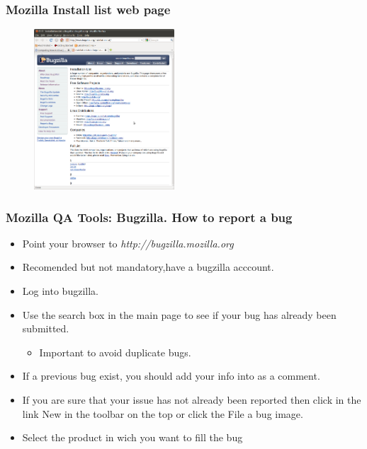 \documentclass{beamer}
\begin{document}
\begin{frame}
\frametitle{Mozilla Install list web page}
\begin{center}
\begin{figure}
 \includegraphics[height=6cm]{figs/Bugzilla_Install_List.png}
\end{figure}
\end{center}
\end{frame}


\begin{frame}
 \frametitle{Mozilla QA Tools: Bugzilla. How to report a bug}
 \begin{itemize}
    \item Point your browser to \textit{http://bugzilla.mozilla.org}
    \item Recomended but not mandatory,have a bugzilla acccount.
    \item Log into bugzilla.
    \item Use the search box in the main page to see if your bug has already been submitted.
    \begin{itemize}
       \item Important to avoid duplicate bugs.
    \end{itemize}
    \item If a previous bug exist, you should add your info into as a comment.
    \item If you are sure that your issue has not already been reported then click in the link New in the toolbar on the top or click the File a bug image.
    \item Select the product in wich you want to fill the bug
 \end{itemize}
\end{frame}

\end{document}

